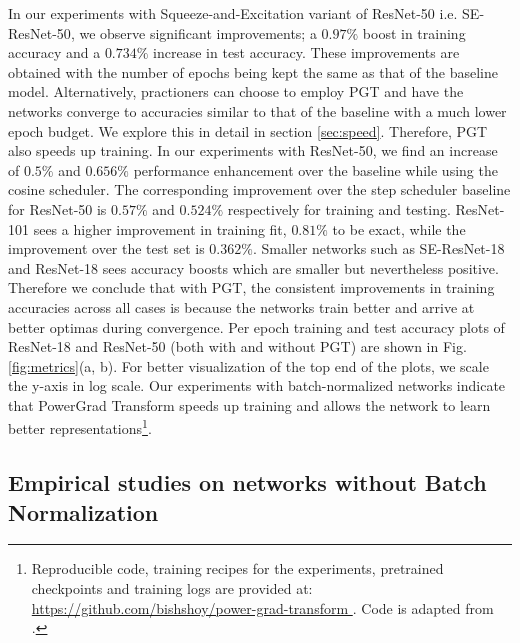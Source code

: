 \documentclass[times,sort&compress]{elsarticle}
\begin{document}
In our experiments with Squeeze-and-Excitation variant of ResNet-50 i.e.
SE-ResNet-50\cite{hu2018squeeze}, we observe significant improvements; a $0.97\%$ boost
in training accuracy and a $0.734\%$ increase in test accuracy. These improvements are
obtained with the number of epochs being kept the same as that of the baseline model.
Alternatively, practioners can choose to employ PGT and have the networks converge to
accuracies similar to that of the baseline with a much lower epoch budget. We explore
this in detail in section \ref{sec:speed}. Therefore, PGT also speeds up training. In
our experiments with ResNet-50, we find an increase of $0.5\%$ and $0.656\%$ performance
enhancement over the baseline while using the cosine scheduler. The corresponding
improvement over the step scheduler baseline for ResNet-50 is $0.57\%$ and $0.524\%$
respectively for training and testing. ResNet-101 sees a higher improvement in training
fit, $0.81\%$ to be exact, while the improvement over the test set is $0.362\%$. Smaller
networks such as SE-ResNet-18 and ResNet-18 sees accuracy boosts which are smaller but
nevertheless positive. Therefore we conclude that with PGT, the consistent improvements
in training accuracies across all cases is because the networks train better and arrive
at better optimas during convergence. Per epoch training and test accuracy plots of
ResNet-18 and ResNet-50 (both with and without PGT) are shown in Fig.
\ref{fig:metrics}(a, b). For better visualization of the top end of the plots, we scale
the y-axis in log scale. Our experiments with batch-normalized networks indicate that
PowerGrad Transform speeds up training and allows the network to learn better
representations\footnote{Reproducible code, training recipes for the experiments,
pretrained checkpoints and training logs are provided at: \\
\url{ https://github.com/bishshoy/power-grad-transform }. Code is adapted from
\cite{rw2019timm}.}.













\subsection{Empirical studies on networks without Batch Normalization}
\label{sec:Empi}
\end{document}
